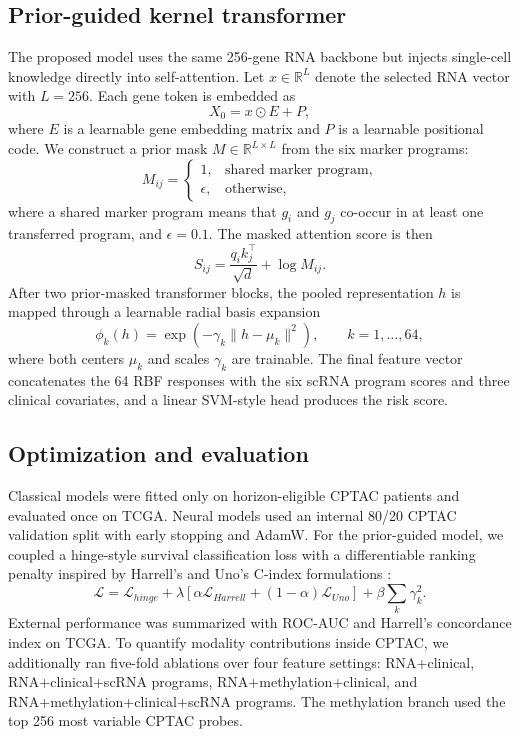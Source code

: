 \subsection{Prior-guided kernel transformer}
The proposed model uses the same 256-gene RNA backbone but injects single-cell knowledge directly into self-attention. Let $x \in \mathbb{R}^{L}$ denote the selected RNA vector with $L=256$. Each gene token is embedded as
\begin{equation}
X_0 = x \odot E + P,
\end{equation}
where $E$ is a learnable gene embedding matrix and $P$ is a learnable positional code. We construct a prior mask $M \in \mathbb{R}^{L \times L}$ from the six marker programs:
\begin{equation}
M_{ij} =
\begin{cases}
1, & \text{shared marker program},\\
\epsilon, & \text{otherwise},
\end{cases}
\end{equation}
where a shared marker program means that $g_i$ and $g_j$ co-occur in at least one transferred program, and $\epsilon=0.1$. The masked attention score is then
\begin{equation}
S_{ij} = \frac{q_i k_j^\top}{\sqrt{d}} + \log M_{ij}.
\end{equation}
After two prior-masked transformer blocks, the pooled representation $h$ is mapped through a learnable radial basis expansion
\begin{equation}
\phi_k(h) = \exp\left(-\gamma_k \lVert h - \mu_k \rVert^2\right), \qquad k=1,\dots,64,
\end{equation}
where both centers $\mu_k$ and scales $\gamma_k$ are trainable. The final feature vector concatenates the 64 RBF responses with the six scRNA program scores and three clinical covariates, and a linear SVM-style head produces the risk score.

\subsection{Optimization and evaluation}
Classical models were fitted only on horizon-eligible CPTAC patients and evaluated once on TCGA. Neural models used an internal 80/20 CPTAC validation split with early stopping and AdamW. For the prior-guided model, we coupled a hinge-style survival classification loss with a differentiable ranking penalty inspired by Harrell's and Uno's C-index formulations \cite{harrell1982evaluating,uno2011cstatistics}:
\begin{equation}
\mathcal{L} = \mathcal{L}_{hinge} + \lambda \left[\alpha \mathcal{L}_{Harrell} + (1-\alpha)\mathcal{L}_{Uno}\right] + \beta \sum_k \gamma_k^2.
\end{equation}
External performance was summarized with ROC-AUC and Harrell's concordance index on TCGA. To quantify modality contributions inside CPTAC, we additionally ran five-fold ablations over four feature settings: RNA+clinical, RNA+clinical+scRNA programs, RNA+methylation+clinical, and RNA+methylation+clinical+scRNA programs. The methylation branch used the top 256 most variable CPTAC probes.

